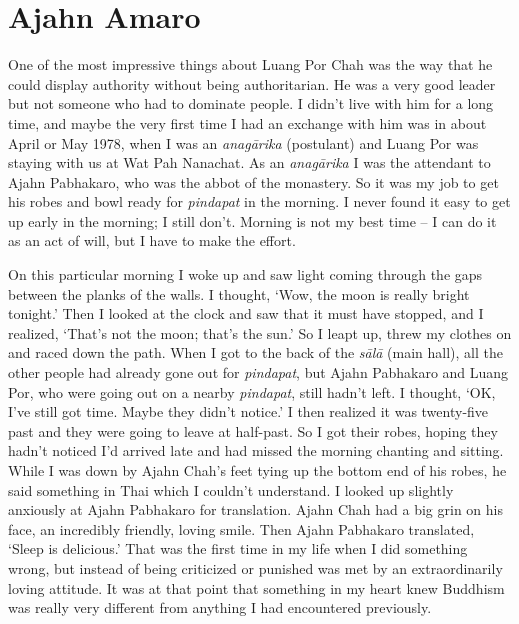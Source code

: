 \section{Ajahn Amaro}

One of the most impressive things about Luang Por Chah was the way that
he could display authority without being authoritarian. He was a very
good leader but not someone who had to dominate people. I didn't live
with him for a long time, and maybe the very first time I had an
exchange with him was in about April or May 1978, when I was an
\emph{anagārika} (postulant) and Luang Por was staying with us at Wat
Pah Nanachat. As an \emph{anagārika} I was the attendant to Ajahn
Pabhakaro, who was the abbot of the monastery. So it was my job to get
his robes and bowl ready for \emph{pindapat} in the morning. I never
found it easy to get up early in the morning; I still don't. Morning is
not my best time -- I can do it as an act of will, but I have to make
the effort. 

On this particular morning I woke up and saw light coming through the
gaps between the planks of the walls. I thought, `Wow, the moon is
really bright tonight.' Then I looked at the clock and saw that it must
have stopped, and I realized, `That's not the moon; that's the sun.' So
I leapt up, threw my clothes on and raced down the path. When I got to
the back of the \emph{sālā} (main hall), all the other people had
already gone out for \emph{pindapat}, but Ajahn Pabhakaro and Luang Por, 
who were going out on a nearby \emph{pindapat}, still hadn't left. I
thought, `OK, I've still got time. Maybe they didn't notice.' I then
realized it was twenty-five past and they were going to leave at
half-past. So I got their robes, hoping they hadn't noticed I'd arrived
late and had missed the morning chanting and sitting. While I was down
by Ajahn Chah's feet tying up the bottom end of his robes, he said
something in Thai which I couldn't understand. I looked up slightly
anxiously at Ajahn Pabhakaro for translation. Ajahn Chah had a big grin
on his face, an incredibly friendly, loving smile. Then Ajahn Pabhakaro
translated, `Sleep is delicious.' That was the first time in my life
when I did something wrong, but instead of being criticized or punished
was met by an extraordinarily loving attitude. It was at that point that
something in my heart knew Buddhism was really very different from
anything I had encountered previously. 

